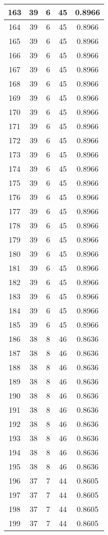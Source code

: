 \documentclass[letterpaper, 12pt]{article}
\begin{document}
\begin{longtable}{|c|c|c|c|c|}
\hline
163 & 39 & 6 & 45 & 0.8966 \\
\hline
164 & 39 & 6 & 45 & 0.8966 \\
\hline
165 & 39 & 6 & 45 & 0.8966 \\
\hline
166 & 39 & 6 & 45 & 0.8966 \\
\hline
167 & 39 & 6 & 45 & 0.8966 \\
\hline
168 & 39 & 6 & 45 & 0.8966 \\
\hline
169 & 39 & 6 & 45 & 0.8966 \\
\hline
170 & 39 & 6 & 45 & 0.8966 \\
\hline
171 & 39 & 6 & 45 & 0.8966 \\
\hline
172 & 39 & 6 & 45 & 0.8966 \\
\hline
173 & 39 & 6 & 45 & 0.8966 \\
\hline
174 & 39 & 6 & 45 & 0.8966 \\
\hline
175 & 39 & 6 & 45 & 0.8966 \\
\hline
176 & 39 & 6 & 45 & 0.8966 \\
\hline
177 & 39 & 6 & 45 & 0.8966 \\
\hline
178 & 39 & 6 & 45 & 0.8966 \\
\hline
179 & 39 & 6 & 45 & 0.8966 \\
\hline
180 & 39 & 6 & 45 & 0.8966 \\
\hline
181 & 39 & 6 & 45 & 0.8966 \\
\hline
182 & 39 & 6 & 45 & 0.8966 \\
\hline
183 & 39 & 6 & 45 & 0.8966 \\
\hline
184 & 39 & 6 & 45 & 0.8966 \\
\hline
185 & 39 & 6 & 45 & 0.8966 \\
\hline
186 & 38 & 8 & 46 & 0.8636 \\
\hline
187 & 38 & 8 & 46 & 0.8636 \\
\hline
188 & 38 & 8 & 46 & 0.8636 \\
\hline
189 & 38 & 8 & 46 & 0.8636 \\
\hline
190 & 38 & 8 & 46 & 0.8636 \\
\hline
191 & 38 & 8 & 46 & 0.8636 \\
\hline
192 & 38 & 8 & 46 & 0.8636 \\
\hline
193 & 38 & 8 & 46 & 0.8636 \\
\hline
194 & 38 & 8 & 46 & 0.8636 \\
\hline
195 & 38 & 8 & 46 & 0.8636 \\
\hline
196 & 37 & 7 & 44 & 0.8605 \\
\hline
197 & 37 & 7 & 44 & 0.8605 \\
\hline
198 & 37 & 7 & 44 & 0.8605 \\
\hline
199 & 37 & 7 & 44 & 0.8605 \\
\hline
\end{longtable}
\end{document}
